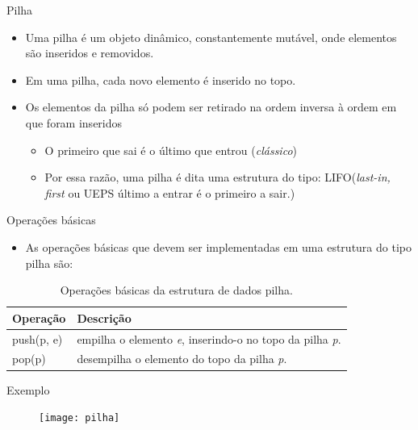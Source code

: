    \begin{frame}{Pilha}     
			\begin{itemize}
				\item Uma pilha é um objeto dinâmico, constantemente mutável, onde elementos são inseridos e removidos.
				\item Em uma pilha, cada novo elemento é inserido no topo.
				\item Os elementos da pilha só podem ser retirado na ordem inversa à ordem em que foram inseridos				
					\begin{itemize}
						\item O primeiro que sai é o último que entrou (\textit{clássico})
						\item Por essa razão, uma pilha é dita uma estrutura 
						do tipo: \alert{LIFO}(\textit{last-in, first} ou UEPS último a entrar é o primeiro a sair.)
					\end{itemize}
			\end{itemize}
  \end{frame}
  
   \begin{frame}{Operações básicas}     
			\begin{itemize}
				\item As operações básicas que devem ser implementadas em uma estrutura do tipo pilha são:
			\end{itemize}
			\begin{table}[ht]
			  \centering
						\begin{tabular}{l|l}
						    \hline \textbf{Operação} & \textbf{Descrição} \\
						    \hline push(p, e) & empilha o elemento \textit{e}, inserindo-o no topo da pilha \textit{p}.\\
						    \hline pop(p) & desempilha o elemento do topo da pilha \textit{p}.\\
						    \hline 
						\end{tabular}
						\caption{Operações básicas da estrutura de dados pilha.}
				\end{table}
  \end{frame}
  
   \begin{frame}[c]{Exemplo} 
		   	\begin{figure}[!htpb]
				\centering
				\texttt{[image: pilha]}
			\end{figure} 
   \end{frame}
  
